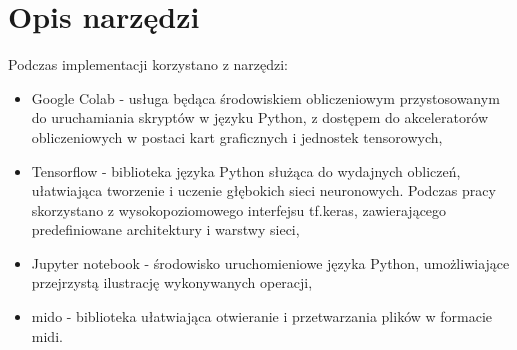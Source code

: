 {  \section{Opis narzędzi}
  {
    Podczas implementacji korzystano z narzędzi:
    \begin{itemize}
      \setlength\itemsep{-0.5em}
      \item Google Colab - usługa będąca środowiskiem obliczeniowym przystosowanym 
      do uruchamiania skryptów w języku Python, z dostępem do akceleratorów obliczeniowych
      w postaci kart graficznych i jednostek tensorowych,
      \item Tensorflow - biblioteka języka Python służąca do wydajnych obliczeń, ułatwiająca 
      tworzenie i uczenie głębokich sieci neuronowych. Podczas pracy skorzystano z 
      wysokopoziomowego interfejsu tf.keras, zawierającego predefiniowane architektury i warstwy sieci,
      \item Jupyter notebook - środowisko uruchomieniowe języka Python, umożliwiające przejrzystą
      ilustrację wykonywanych operacji,
      \item mido - biblioteka ułatwiająca otwieranie i przetwarzania plików w formacie midi.
    \end{itemize}
  }
}